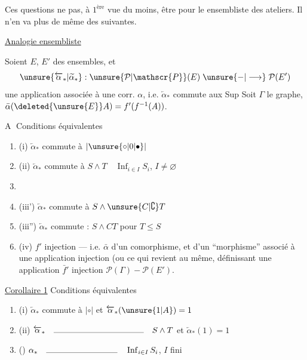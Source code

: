 
Ces questions ne  pas, à $1^{\mathrm{ère}}$ vue du moins, être    pour le  ensembliste des ateliers. Il n'en va plus de même des suivantes.

\uline{Analogie ensembliste}

Soient $E$, $E'$ des ensembles, et
\[
\unsure{\overleftarrow{\alpha}_*|\widetilde{\alpha}_*}:
\unsure{\mathcal{P}|\mathscr{P}}(E)\mathrel{\unsure{-|\longrightarrow}}\mathcal{P}(E')
\]
une application associée à une corr. $\alpha$, i.e. $\overleftarrow{\alpha}_*$ commute aux Sup  Soit $\Gamma$ le graphe, 
 $\bar\alpha(\deleted{\unsure{E}}A)=f'(f^{-1}(A))$.

\textcircled{A} Conditions équivalentes
\begin{enumerate}[label={},leftmargin=1.8em]
\item (i) $\overleftarrow{\alpha}_*$ commute à $|\unsure{\circ|0|\bullet}|$
\item (ii) $\overleftarrow{\alpha}_*$ commute à $S\wedge T\quad \operatorname{Inf}_{i\in I}S_i$,  $I\ne\varnothing$
\item {}
\item (iii') $\overleftarrow{\alpha}_*$ commute à $S\wedge\unsure{C|\complement}T$
\item (iii'') $\overleftarrow{\alpha}_*$ commute : $S\wedge CT$ pour $T\leq S$
\item (iv) $f'$ injection --- i.e. $\bar\alpha$  d'un comorphisme, et d'un ``morphisme'' associé à une application injection (ou ce qui revient au même, définissant une application $\bar f'$ injection $\mathcal{P}(\Gamma)\mathrel{-}\mathcal{P}(E')$.
\end{enumerate}

\uline{Corollaire 1} Conditions équivalentes
\begin{enumerate}[label={},leftmargin=1.8em]
\item (i) $\overleftarrow{\alpha}_*$ commute à $|\circ|$ et $\overleftarrow{\alpha}_*(\unsure{1|A})=1$
\item (ii) $\overleftarrow{\alpha}_*\quad\rule{3.8cm}{0.3pt}\quad S\wedge T$ et $\overleftarrow{\alpha}_*(1)=1$
\item () $\alpha_*\quad\rule{3cm}{0.3pt}\quad\operatorname{Inf}_{i\in I}S_i$, $I$ fini
\end{enumerate}

